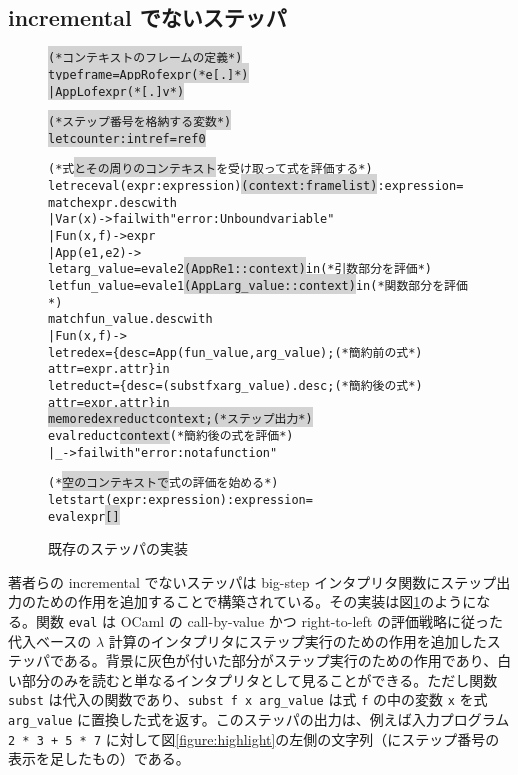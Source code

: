 \subsection{incremental でないステッパ}

\begin{figure}[t]
  \begin{alltt}
\colorbox{lightgray}{(* コンテキストのフレームの定義 *)}
\colorbox{lightgray}{type frame = AppR of expr  (* e [.] *)}
\colorbox{lightgray}{           | AppL of expr  (* [.] v *)}

\colorbox{lightgray}{(* ステップ番号を格納する変数 *)}
\colorbox{lightgray}{let counter : int ref = ref 0}

(* 式\colorbox{lightgray}{とその周りのコンテキスト}を受け取って式を評価する *)
let rec eval (expr : expression) \colorbox{lightgray}{(context : frame list)} : expression =
  match expr.desc with
  | Var (x) -> failwith "error: Unbound variable"
  | Fun (x, f) -> expr
  | App (e1, e2) ->
    let arg\_value = eval e2 \colorbox{lightgray}{(AppR e1 :: context)} in          (* 引数部分を評価 *)
    let fun\_value = eval e1 \colorbox{lightgray}{(AppL arg\_value :: context)} in   (* 関数部分を評価 *)
    match fun\_value.desc with
    | Fun (x, f) ->
    let redex = \{desc = App (fun\_value, arg\_value);               (* 簡約前の式 *)
                 attr = expr.attr\} in
      let reduct = \{desc = (subst f x arg\_value).desc ;          (* 簡約後の式 *)
                    attr = expr.attr\} in
      \colorbox{lightgray}{memo redex reduct context;                              (* ステップ出力 *)}
      eval reduct \colorbox{lightgray}{context}                                  (* 簡約後の式を評価 *)
    | \_ -> failwith "error: not a function"

(* \colorbox{lightgray}{空のコンテキストで}式の評価を始める *)
let start (expr : expression) : expression =
  eval expr \colorbox{lightgray}{[]}
\end{alltt}
\caption{既存のステッパの実装}
\label{figure:old-stepper}
\end{figure}

著者らの incremental でないステッパ\cite{FSA18}は big-step インタプリタ関数にステップ出力のための作用を追加することで構築されている。その実装は図\ref{figure:old-stepper}のようになる。関数 \texttt{eval} は OCaml の call-by-value かつ right-to-left の評価戦略に従った代入ベースの $\lambda$ 計算のインタプリタにステップ実行のための作用を追加したステッパである。背景に灰色が付いた部分がステップ実行のための作用であり、白い部分のみを読むと単なるインタプリタとして見ることができる。ただし関数 \texttt{subst} は代入の関数であり、\texttt{subst f x arg\_value} は式 \texttt{f} の中の変数 \texttt{x} を式 \texttt{arg\_value} に置換した式を返す。このステッパの出力は、例えば入力プログラム \texttt{2 * 3 + 5 * 7} に対して図\ref{figure:highlight}の左側の文字列（にステップ番号の表示を足したもの）である。

